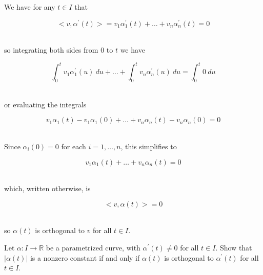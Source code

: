 \documentclass[12pt,letterpaper]{hmcpset}
\begin{document}
\begin{solution}

We have for any $t \in I$ that

\[ <v,\alpha^{\prime}(t)> = v_1\alpha_1^{\prime}(t) + \dots + v_n \alpha_n^{\prime}(t) =0 \]\

so integrating both sides from 0 to $t$ we have

\[ \int_0^t  v_1\alpha_1^{\prime}(u)\ du + \dots + \int_0^t v_n \alpha_n^{\prime}(u)\ du =\int_0^t 0\ du \]\

or evaluating the integrals

\[ v_1 \alpha_1(t) - v_1 \alpha_1(0) + \dots +  v_n \alpha_n(t) - v_n \alpha_n(0)  = 0 \]\

Since  $\alpha_i(0) = 0$ for each $i = 1,\dots, n$, this simplifies to 

\[ v_1 \alpha_1(t) + \dots +  v_n \alpha_n(t)  = 0 \]\

which, written otherwise, is

\[ <v, \alpha(t)> = 0 \]\

so $\alpha(t)$ is orthogonal to $v$ for all $t \in I$.


\end{solution}

\newpage




\begin{problem}
Let $\alpha: I \to \mathbb{R}$ be a parametrized curve, with $\alpha^{\prime}(t) \neq 0$ for all $t \in I$.  
Show that $\vert \alpha(t)\vert$ is a nonzero constant if and only if $\alpha(t)$ is orthogonal to $\alpha^{\prime}(t)$ for all $t \in I$.
\end{problem}
\end{document}
